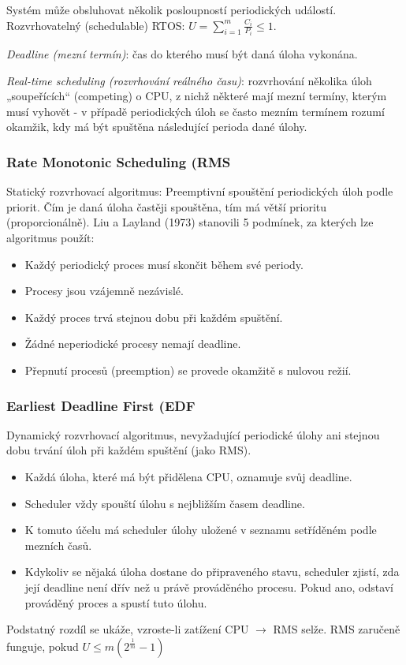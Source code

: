 Systém může obsluhovat několik posloupností periodických událostí. Rozvrhovatelný (schedulable) RTOS: $ U = \displaystyle{\sum_{i=1}^m} \frac{C_i}{P_i} \leq 1 $.
\vspace{3cm}

\textit{Deadline (mezní termín)}: čas do kterého musí být daná úloha vykonána.

\textit{Real-time scheduling (rozvrhování reálného času)}: rozvrhování několika úloh „soupeřících“ (competing) o CPU, z nichž některé mají mezní termíny, kterým musí vyhovět - v případě periodických úloh se často mezním termínem rozumí okamžik, kdy má být spuštěna následující perioda dané úlohy.

\subsubsection*{Rate Monotonic Scheduling (RMS}
Statický rozvrhovací algoritmus: Preemptivní spouštění periodických úloh podle priorit. Čím je daná úloha častěji spouštěna, tím má větší prioritu (proporcionálně). Liu a Layland (1973) stanovili 5 podmínek, za kterých lze algoritmus použít:
\begin{itemize}
\item Každý periodický proces musí skončit během své periody.
\item Procesy jsou vzájemně nezávislé.
\item Každý proces trvá stejnou dobu při každém spuštění.
\item Žádné neperiodické procesy nemají deadline.
\item Přepnutí procesů (preemption) se provede okamžitě s nulovou režií.
\end{itemize}
\vspace{2cm}

\subsubsection*{Earliest Deadline First (EDF}
Dynamický rozvrhovací algoritmus, nevyžadující periodické úlohy ani stejnou dobu trvání úloh při každém spuštění (jako RMS).
\begin{itemize}
\item Každá úloha, které má být přidělena CPU, oznamuje svůj deadline.
\item Scheduler vždy spouští úlohu s nejbližším časem deadline.
\item K tomuto účelu má scheduler úlohy uložené v seznamu setříděném podle mezních časů.
\item Kdykoliv se nějaká úloha dostane do připraveného stavu, scheduler zjistí, zda její deadline není dřív než u právě prováděného procesu. Pokud ano, odstaví prováděný proces a spustí tuto úlohu.
\end{itemize}
\vspace{2cm}
Podstatný rozdíl se ukáže, vzroste-li zatížení CPU $ \to $ RMS selže. RMS zaručeně funguje, pokud $ U \leq m(2^{\frac{1}{m}}-1) $

